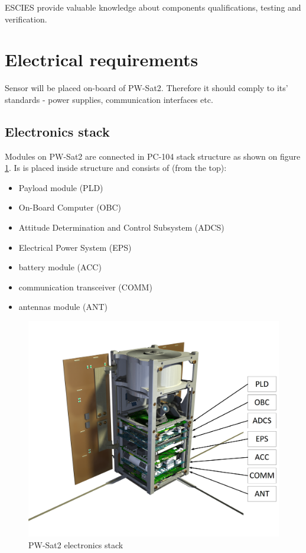     ESCIES \cite{ESCIES_URL} provide valuable knowledge about components qualifications, testing and verification.



\section{Electrical requirements}
    Sensor will be placed on-board of PW-Sat2. Therefore it should comply to its' standards - power supplies, communication interfaces etc.

\subsection{Electronics stack}
    Modules on PW-Sat2 are connected in PC-104 stack structure as shown on figure \ref{PW-Sat2_stack}. Is is placed inside structure and consists of (from the top):
    \begin{itemize}
        \item Payload module (PLD)
        \item On-Board Computer (OBC)
        \item Attitude Determination and Control Subsystem (ADCS)
        \item Electrical Power System (EPS)
        \item battery module (ACC)
        \item communication transceiver (COMM)
        \item antennas module (ANT)
    \end{itemize}

    \begin{figure}[H]
        \centering
        \includegraphics[width=0.7\paperwidth]{img/PW-Sat2-stack.png}
        \caption{PW-Sat2 electronics stack}
        \label{PW-Sat2_stack}
    \end{figure}


